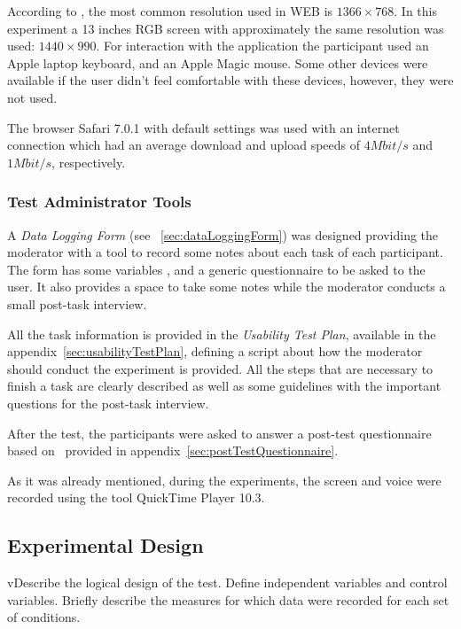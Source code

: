 \documentclass[a4paper]{article}
\begin{document}
According to \citep{http://www.satya-weblog.com/2013/07/desktop-laptop-mobile-screen-resolution-most-common-worldwide.html}, the most common resolution used in WEB is $1366\times 768$. In this experiment a 13 inches RGB screen with approximately the same resolution was used: $1440\times 990$. For interaction with the application the participant used an Apple laptop keyboard, and an Apple Magic mouse. Some other devices were available if the user didn't feel comfortable with these devices, however, they were not used.

The browser Safari 7.0.1 with default settings was used with an internet connection which had an average download and upload speeds of $4 Mbit/s$ and $1Mbit/s$, respectively.


\subsubsection{Test Administrator Tools}

A \emph{Data Logging Form} (see ~\ref{sec:dataLoggingForm}) was designed providing the moderator with a tool to record some notes about each task of each participant. The form has some variables , and a generic questionnaire to be asked to the user. It also provides a space to take some notes while the moderator conducts a small post-task interview.

All the task information is provided in the \emph{Usability Test Plan}, available in the appendix~\ref{sec:usabilityTestPlan}, defining a script about how the moderator should conduct the experiment is provided. All the steps that are necessary to finish a task are clearly described as well as some guidelines with the important questions for the post-task interview.

After the test, the participants were asked to answer a post-test questionnaire based on~\citep{} provided in appendix~\ref{sec:postTestQuestionnaire}.

As it was already mentioned, during the experiments, the screen and voice were recorded using the tool QuickTime Player 10.3.

\subsection{Experimental Design}
vDescribe the logical design of the test. Define independent variables and control variables. Briefly describe the measures for which data were recorded for each set of conditions. 
\end{document}
